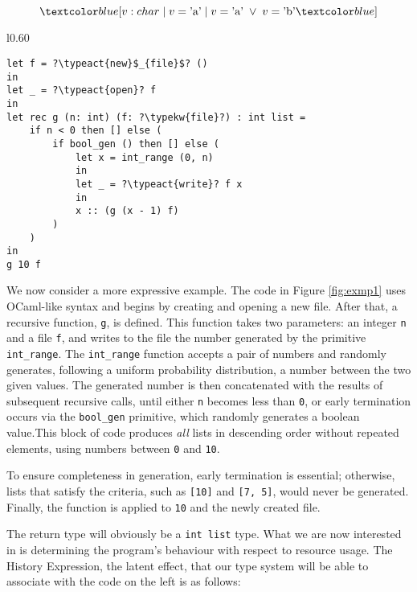 \begin{equation}
    \under{v: char \;|\; v = \text{'a'} \;|\; v = \text{'a'} \;\lor\; v = \text{'b'}}
\end{equation}

\vspace{0pt}
\begin{wrapfigure}{l}{0.60\textwidth}
    \begin{lstlisting}
let f = ?\typeact{new}$_{file}$? ()
in
let _ = ?\typeact{open}? f
in
let rec g (n: int) (f: ?\typekw{file}?) : int list =
    if n < 0 then [] else (
        if bool_gen () then [] else (
            let x = int_range (0, n)
            in
            let _ = ?\typeact{write}? f x
            in
            x :: (g (x - 1) f)
        )
    )
in
g 10 f
    \end{lstlisting}
    \caption{Code that creates and opens a new file, and writes in a series of randomly generated numbers between 0 and 10 including extremes.}
    \label{fig:exmp1}
\end{wrapfigure}

We now consider a more expressive example. The code in Figure \ref{fig:exmp1} uses OCaml-like syntax and begins by creating and opening a new file. After that, a recursive function, \verb|g|, is defined. This function takes two parameters: an integer \verb|n| and a file \verb|f|, and writes to the file the number generated by the primitive \verb|int_range|. The \verb|int_range| function accepts a pair of numbers and randomly generates, following a uniform probability distribution, a number between the two given values. The generated number is then concatenated with the results of subsequent recursive calls, until either \verb|n| becomes less than \verb|0|, or early termination occurs via the \verb|bool_gen| primitive, which randomly generates a boolean value.This block of code produces \emph{all} lists in descending order without repeated elements, using numbers between \verb|0| and \verb|10|.

To ensure completeness in generation, early termination is essential; otherwise, lists that satisfy the criteria, such as \verb|[10]| and \verb|[7, 5]|, would never be generated. Finally, the function is applied to \verb|10| and the newly created file.

The return type will obviously be a \verb|int list| type. What we are now interested in is determining the program's behaviour with respect to resource usage. The History Expression, the latent effect, that our type system will be able to associate with the code on the left is as follows:

